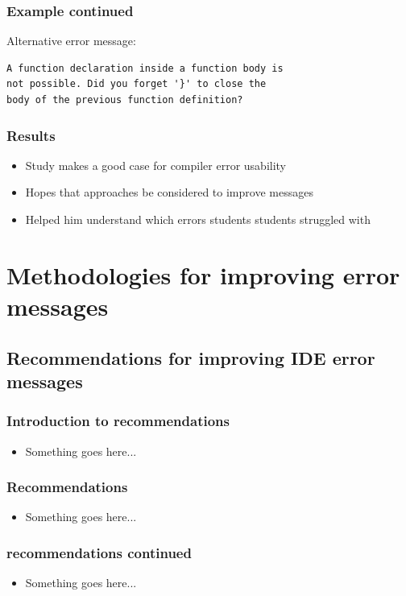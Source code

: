\documentclass{beamer}
\begin{document}
\begin{frame}[fragile]
	\frametitle{Example continued}
Alternative error message:
\begin{verbatim}
A function declaration inside a function body is 
not possible. Did you forget '}' to close the 
body of the previous function definition?
\end{verbatim}

\end{frame}

\begin{frame}
	\frametitle{Results}
		\begin{itemize}
			\item Study makes a good case for compiler error usability
			\item Hopes that approaches be considered to improve messages
			\item Helped him understand which errors students students struggled with
		\end{itemize}

\end{frame}

\section[Methodologies]{Methodologies for improving error messages}

\subsection[DrRacket recommendations]{Recommendations for improving IDE error messages}

\begin{frame}
	\frametitle{Introduction to recommendations}
		\begin{itemize}
			\item Something goes here...
		\end{itemize}

\end{frame}

\begin{frame}
	\frametitle{Recommendations}
		\begin{itemize}
			\item Something goes here...
		\end{itemize}

\end{frame}

\begin{frame}
	\frametitle{recommendations continued}
		\begin{itemize}
			\item Something goes here...
		\end{itemize}

\end{frame}
\end{document}

